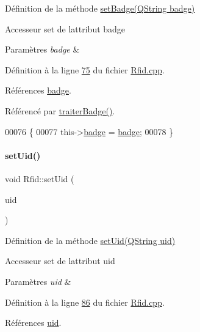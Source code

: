 Définition de la méthode \hyperlink{class_rfid_a51021c0899dab1d5fb08e3dd6d93e425}{set\+Badge(\+Q\+String badge)} 

Accesseur set de l\textquotesingle{}attribut badge 
\begin{DoxyParams}{Paramètres}
{\em badge} & \\
\hline
\end{DoxyParams}


Définition à la ligne \hyperlink{_rfid_8cpp_source_l00075}{75} du fichier \hyperlink{_rfid_8cpp_source}{Rfid.\+cpp}.



Références \hyperlink{_rfid_8h_source_l00056}{badge}.



Référencé par \hyperlink{_rfid_8cpp_source_l00097}{traiter\+Badge()}.


\begin{DoxyCode}
00076 \{
00077     this->\hyperlink{class_rfid_ac634cd26ffbe1c6da3967dc4af53b734}{badge} = \hyperlink{class_rfid_ac634cd26ffbe1c6da3967dc4af53b734}{badge};
00078 \}
\end{DoxyCode}
\mbox{\label{class_rfid_ac79b994b32bf7a7cbad9d9988e721564}} 
\paragraph{\texorpdfstring{set\+Uid()}{setUid()}}
{\footnotesize\ttfamily void Rfid\+::set\+Uid (\begin{DoxyParamCaption}\item[{Q\+String}]{uid }\end{DoxyParamCaption})}



Définition de la méthode \hyperlink{class_rfid_ac79b994b32bf7a7cbad9d9988e721564}{set\+Uid(\+Q\+String uid)} 

Accesseur set de l\textquotesingle{}attribut uid 
\begin{DoxyParams}{Paramètres}
{\em uid} & \\
\hline
\end{DoxyParams}


Définition à la ligne \hyperlink{_rfid_8cpp_source_l00086}{86} du fichier \hyperlink{_rfid_8cpp_source}{Rfid.\+cpp}.



Références \hyperlink{_rfid_8h_source_l00057}{uid}.



